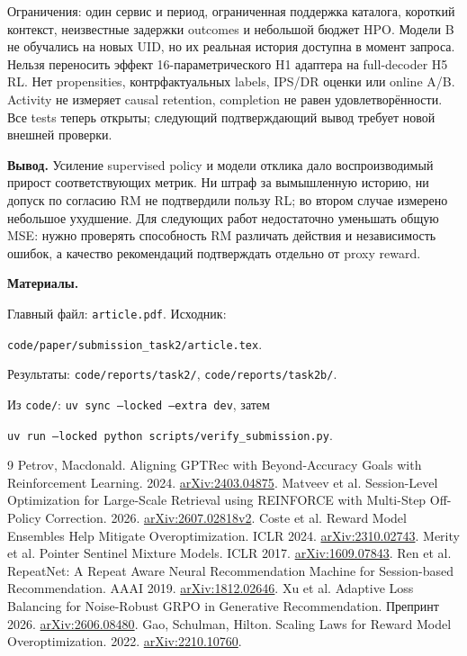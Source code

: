 \documentclass[10pt,a4paper,twocolumn]{article}
\begin{document}
Ограничения: один сервис и период, ограниченная поддержка каталога,
короткий контекст, неизвестные задержки outcomes и небольшой бюджет HPO.
Модели B не обучались на новых UID, но их реальная история доступна
в момент запроса. Нельзя переносить эффект 16-параметрического H1 адаптера
на full-decoder H5 RL. Нет propensities, контрфактуальных labels,
IPS/DR оценки или online A/B. Activity не измеряет causal retention,
completion не равен удовлетворённости. Все tests теперь открыты;
следующий подтверждающий вывод требует новой внешней проверки.

\textbf{Вывод.} Усиление supervised policy и модели отклика дало
воспроизводимый прирост соответствующих метрик. Ни штраф за вымышленную
историю, ни допуск по согласию RM не подтвердили пользу RL;
во втором случае измерено небольшое ухудшение. Для следующих работ
недостаточно уменьшать общую MSE: нужно проверять способность RM
различать действия и независимость ошибок, а качество рекомендаций
подтверждать отдельно от proxy reward.

\vspace{3pt}
\noindent\textbf{Материалы.}\par
{\footnotesize\raggedright\noindent
Главный файл: \texttt{article.pdf}. Исходник:\par
\nolinkurl{code/paper/submission_task2/article.tex}.\par
Результаты: \nolinkurl{code/reports/task2/},
\nolinkurl{code/reports/task2b/}.\par
Из \texttt{code/}: \texttt{uv sync --locked --extra dev}, затем\par
\texttt{uv run --locked python scripts/verify\_submission.py}.\par}

\balance
\begin{thebibliography}{9}\small\setlength{\itemsep}{1pt}
 Petrov, Macdonald. Aligning GPTRec with Beyond-Accuracy Goals
with Reinforcement Learning. 2024. \href{https://arxiv.org/abs/2403.04875}{arXiv:2403.04875}.
 Matveev et al. Session-Level Optimization for Large-Scale
Retrieval using REINFORCE with Multi-Step Off-Policy Correction. 2026.
\href{https://arxiv.org/abs/2607.02818v2}{arXiv:2607.02818v2}.
 Coste et al. Reward Model Ensembles Help Mitigate
Overoptimization. ICLR 2024. \href{https://arxiv.org/abs/2310.02743}{arXiv:2310.02743}.
 Merity et al. Pointer Sentinel Mixture Models. ICLR 2017.
\href{https://arxiv.org/abs/1609.07843}{arXiv:1609.07843}.
 Ren et al. RepeatNet: A Repeat Aware Neural Recommendation
Machine for Session-based Recommendation. AAAI 2019.
\href{https://arxiv.org/abs/1812.02646}{arXiv:1812.02646}.
 Xu et al. Adaptive Loss Balancing for Noise-Robust GRPO in
Generative Recommendation. Препринт 2026.
\href{https://arxiv.org/abs/2606.08480}{arXiv:2606.08480}.
 Gao, Schulman, Hilton. Scaling Laws for Reward Model
Overoptimization. 2022. \href{https://arxiv.org/abs/2210.10760}{arXiv:2210.10760}.
\end{thebibliography}
\end{document}
